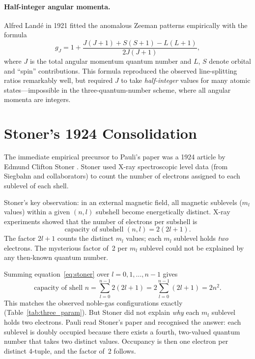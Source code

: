 \documentclass[12pt]{article}
\begin{document}
\paragraph{Half-integer angular momenta.}
Alfred Landé in 1921 \citep{Lande1921} fitted the anomalous Zeeman patterns
empirically with the formula
\begin{equation}\label{eq:lande_g}
  g_J = 1 + \frac{J(J+1) + S(S+1) - L(L+1)}{2J(J+1)},
\end{equation}
where $J$ is the total angular momentum quantum number and $L$, $S$ denote
orbital and ``spin'' contributions.  This formula reproduced the observed
line-splitting ratios remarkably well, but required $J$ to take \emph{half-integer}
values for many atomic states---impossible in the three-quantum-number scheme,
where all angular momenta are integers.

\section{Stoner's 1924 Consolidation}
\label{sec:stoner}

The immediate empirical precursor to Pauli's paper was a 1924 article by
Edmund Clifton Stoner \citep{Stoner1924}.  Stoner used X-ray spectroscopic
level data (from Siegbahn and collaborators) to count the number of electrons
assigned to each sublevel of each shell.

Stoner's key observation: in an external magnetic field, all magnetic
sublevels ($m_l$ values) within a given $(n,l)$ subshell become energetically
distinct.  X-ray experiments showed that the number of electrons per subshell
is
\begin{equation}\label{eq:stoner}
  \text{capacity of subshell } (n,l) = 2(2l+1).
\end{equation}
The factor $2l+1$ counts the distinct $m_l$ values; each $m_l$ sublevel holds
\emph{two} electrons.  The mysterious factor of~2 per $m_l$ sublevel could
not be explained by any then-known quantum number.

Summing equation~\eqref{eq:stoner} over $l=0,1,\ldots,n-1$ gives
\begin{equation}\label{eq:shell_cap}
  \text{capacity of shell } n = \sum_{l=0}^{n-1} 2(2l+1)
  = 2\sum_{l=0}^{n-1}(2l+1) = 2n^2.
\end{equation}
This matches the observed noble-gas configurations exactly
(Table~\ref{tab:three_param}).  But Stoner did not explain \emph{why} each
$m_l$ sublevel holds two electrons.  Pauli read Stoner's paper and recognised
the answer: each sublevel is doubly occupied because there exists a fourth,
two-valued quantum number that takes two distinct values.  Occupancy is then
one electron per distinct 4-tuple, and the factor of~2 follows.
\end{document}
